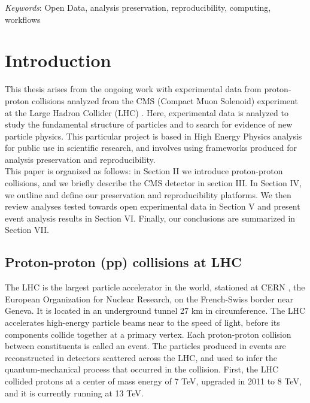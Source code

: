 \documentclass[letter]{article}
\newcommand\tab[1][1cm]{\hspace*{#1}}
\begin{document}
\textit{Keywords}: Open Data, analysis preservation, reproducibility, computing, workflows
\thispagestyle{empty}

\newpage

\tableofcontents

\newpage
\section{Introduction}
\tab This thesis arises from the ongoing work with experimental data from proton-proton collisions analyzed from the CMS (Compact Muon Solenoid) \cite{cms} experiment at the Large Hadron Collider (LHC) \cite{lhc}. Here, experimental data is analyzed to study the fundamental structure of particles and to search for evidence of new particle physics. This particular project is based in High Energy Physics analysis for public use in scientific research, and involves using frameworks produced for analysis preservation and reproducibility. \vspace{3pt}
\\ 
\tab This paper is organized as follows: in Section II we introduce proton-proton collisions, and we briefly describe the CMS detector in section III. In Section IV, we outline and define our preservation and reproducibility platforms. We then review analyses tested towards open experimental data in Section V and present event analysis results in Section VI. Finally, our conclusions are summarized in Section VII.

\subsection{Proton-proton (pp) collisions at LHC}
\tab The LHC is the largest particle accelerator in the world, stationed at CERN \cite{cern}, the European Organization for Nuclear Research, on the French-Swiss border near Geneva. It is located in an underground tunnel 27 km in circumference. The LHC accelerates high-energy particle beams near to the speed of light, before its components collide together at a primary vertex. Each proton-proton collision between constituents is called an event. The particles produced in events are reconstructed in detectors scattered across the LHC, and used to infer the quantum-mechanical process that occurred in the collision. First, the LHC collided protons at a center of mass energy of 7 TeV, upgraded in 2011 to 8 TeV, and it is currently running at 13 TeV.
\end{document}
